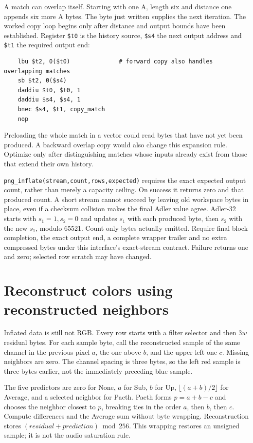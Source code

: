 A match can overlap itself. Starting with one A, length six and distance one
appends six more A bytes. The byte just written supplies the next iteration.
The worked copy loop begins only after distance and output bounds have been
established. Register \texttt{\$t0} is the history source, \texttt{\$s4} the
next output address and \texttt{\$t1} the required output end:
\begin{verbatim}
    lbu $t2, 0($t0)              # forward copy also handles overlapping matches
    sb $t2, 0($s4)
    daddiu $t0, $t0, 1
    daddiu $s4, $s4, 1
    bnec $s4, $t1, copy_match
    nop
\end{verbatim}
Preloading the whole match in a vector could read bytes that have not yet been
produced. A backward overlap copy would also change this expansion rule.
Optimize only after distinguishing matches whose inputs already exist from
those that extend their own history.

\texttt{png\_inflate(stream,count,rows,expected)} requires the exact expected
output count, rather than merely a capacity ceiling. On success it returns zero
and that produced count. A short stream cannot succeed by leaving old workspace
bytes in place, even if a checksum collision makes the final Adler value agree.
Adler-32 starts with $s_1=1,s_2=0$ and updates $s_1$ with each produced byte,
then $s_2$ with the new $s_1$, modulo 65521. Count only bytes actually emitted.
Require final block completion, the exact output end, a complete wrapper trailer
and no extra compressed bytes under this interface's exact-stream contract.
Failure returns one and zero; selected row scratch may have changed.

\section{Reconstruct colors using reconstructed neighbors}

Inflated data is still not RGB. Every row starts with a filter selector and
then $3w$ residual bytes. For each sample byte, call the reconstructed sample
of the same channel in the previous pixel $a$, the one above $b$, and the upper
left one $c$. Missing neighbors are zero. The channel spacing is three bytes,
so the left red sample is three bytes earlier, not the immediately preceding
blue sample.

The five predictors are zero for None, $a$ for Sub, $b$ for Up,
$\lfloor(a+b)/2\rfloor$ for Average, and a selected neighbor for Paeth.
Paeth forms $p=a+b-c$ and chooses the neighbor closest to $p$, breaking ties
in the order $a$, then $b$, then $c$. Compute differences and the Average sum
without byte wrapping. Reconstruction stores
$(residual+prediction)\bmod256$. This wrapping restores an unsigned sample;
it is not the audio saturation rule.

